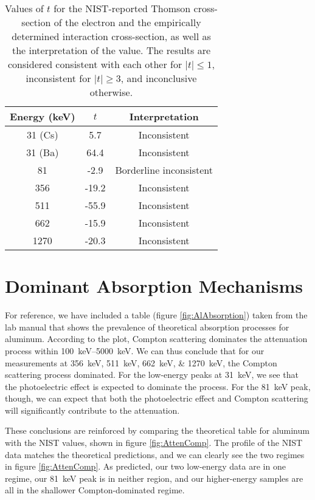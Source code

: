 \documentclass[letter]{article}
\begin{document}
\begin{table}[h] 
\centering  \begin{tabular}{ c  c   c } 
Energy (\unit{\kilo\electronvolt}) & $t$ & Interpretation \\ \hline
31 (Cs) & 5.7 & Inconsistent \\ 
31 (Ba) & 64.4 & Inconsistent \\
81 &  -2.9 & Borderline inconsistent\\
356 & -19.2 & Inconsistent\\
511 &  -55.9 & Inconsistent\\
662 & -15.9 & Inconsistent \\
1270 &  -20.3 & Inconsistent
\end{tabular}
\caption{Values of $t$ for the NIST-reported Thomson cross-section of the electron and the empirically determined interaction cross-section, as well as the interpretation of the value. The results are considered consistent with each other for $|t| \leq 1$, inconsistent for $|t|\geq3$, and inconclusive otherwise. }
\label{tab:tSigma}
\end{table}


\section{Dominant Absorption Mechanisms}

For reference, we have included a table (figure \ref{fig:AlAbsorption}) taken from the lab manual that shows the prevalence of theoretical absorption processes for aluminum. According to the plot, Compton scattering dominates the attenuation process within \qtyrange{100}{5000}{\kilo\electronvolt}. We can thus conclude that for our measurements at \qtylist{356;511;662;1270}{\kilo\electronvolt}, the Compton scattering process dominated. For the low-energy peaks at \qty{31}{\kilo\electronvolt}, we see that the photoelectric effect is expected to dominate the process. For the \qty{81}{\kilo\electronvolt} peak, though, we can expect that both the photoelectric effect and Compton scattering will significantly contribute to the attenuation. 

These conclusions are reinforced by comparing the theoretical table for aluminum with the NIST values, shown in figure \ref{fig:AttenComp}. The profile of the NIST data matches the theoretical predictions, and we can clearly see the two regimes in figure \ref{fig:AttenComp}. As predicted, our two low-energy data are in one regime, our \qty{81}{\kilo\electronvolt} peak is in neither region, and our higher-energy samples are all in the shallower Compton-dominated regime.
\end{document}
